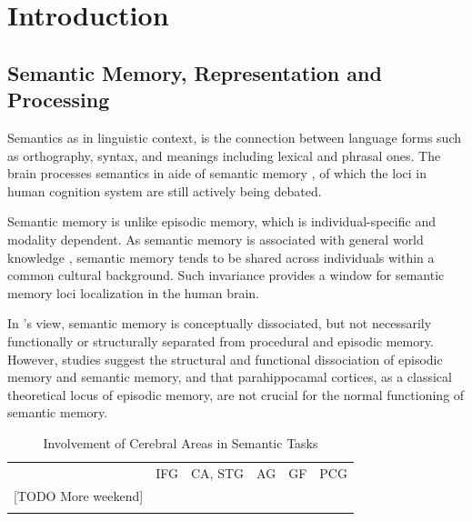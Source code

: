\chapter{Introduction} 

\label{chap:introduction} 

\section{Semantic Memory, Representation and Processing} 

Semantics as in linguistic context, is the connection between language forms such as orthography, syntax, and meanings including lexical and phrasal ones. The brain processes semantics in aide of semantic memory \parencite{tulvingEpisodicSemanticMemory1972}, of which the loci in human cognition system are still actively being debated. 

Semantic memory is unlike episodic memory, which is individual-specific and modality dependent. As semantic memory is associated with general world knowledge \parencite{mcraeSemanticMemory2013}, semantic memory tends to be shared across individuals within a common cultural background. Such invariance provides a window for semantic memory loci localization in the human brain. 

In \citeauthor{tulvingEpisodicSemanticMemory1972}'s view, semantic memory is conceptually dissociated, but not necessarily functionally or structurally separated from procedural and episodic memory. However, studies \parencite{vargha-khademDifferentialEffectsEarly1997} suggest the structural and functional dissociation of episodic memory and semantic memory, and that parahippocamal cortices, as a classical theoretical locus of episodic memory, are not crucial for the normal functioning of semantic memory.

\begin{table}

\centering

\begin{tabularx}{\textwidth}{@{} L *{5}{X} @{}}
\toprule
{} &  &  &  &  & \\
\midrule
\cite{tsukiuraDissociableRolesBilateral2006} & IFG & CA, STG & AG & GF & PCG \\
{[}TODO More weekend{]} &  &  &  &  &  \\
\bottomrule \\
\end{tabularx}
\caption{Involvement of Cerebral Areas in Semantic Tasks}
\label{tab:distributedareastudysynthesis}
\end{table}
    

